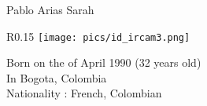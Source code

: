 \documentclass[a4paper, 11pt]{article}
\begin{document}
{\noindent \Huge{Pablo Arias Sarah}\\}

\begin{wrapfigure}[5]{R}{0.15\textwidth}
\vspace{-1.5cm}
\hspace{-1.5cm}
\texttt{[image: pics/id\_ircam3.png]}
\end{wrapfigure}

\vspace{-0.2cm}
\noindent \begin{flushleft} Born on the  of April 1990 (32 years old) \\
\noindent In Bogota, Colombia \\
\noindent Nationality : French, Colombian \\ \end{flushleft}


\end{document}
